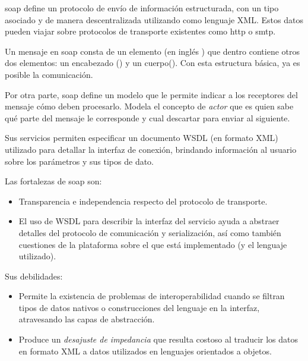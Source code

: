 \gls{soap} define un protocolo de envío de información estructurada, con un tipo asociado y de manera descentralizada utilizando como lenguaje \gls{XML}\cite{box2000simple}. Estos datos pueden viajar sobre protocolos de transporte existentes como \gls{http} o \gls{smtp}.

Un mensaje en \gls{soap} consta de un elemento  (en inglés ) que dentro contiene otros dos elementos: un encabezado () y un cuerpo(). Con esta estructura básica, ya es posible la comunicación.

\begingroup
\endgroup

Por otra parte, \gls{soap} define un modelo que le permite indicar a los receptores del mensaje cómo deben procesarlo. Modela el concepto de \textit{actor} que es quien sabe qué parte del mensaje le corresponde y cual descartar para enviar al siguiente.

Sus servicios permiten especificar un documento \gls{WSDL} (en formato \gls{XML}) utilizado para detallar la interfaz de conexión, brindando información al usuario sobre los parámetros y sus tipos de dato.

Las fortalezas de \gls{soap}\cite{pautasso2008restful} son:

\begin{itemize}
\item Transparencia e independencia respecto del protocolo de transporte.
\item El uso de \gls{WSDL} para describir la interfaz del servicio ayuda a abstraer detalles del protocolo de comunicación y serialización, así como también cuestiones de la plataforma sobre el que está implementado (y el lenguaje utilizado).
\end{itemize}

Sus debilidades:

\begin{itemize}
\item Permite la existencia de problemas de interoperabilidad cuando se filtran tipos de datos nativos o construcciones del lenguaje en la interfaz, atravesando las capas de abstracción.
\item Produce un \textit{desajuste de impedancia} que resulta costoso al traducir los datos en formato \gls{XML} a datos utilizados en lenguajes orientados a objetos.
\end{itemize}

